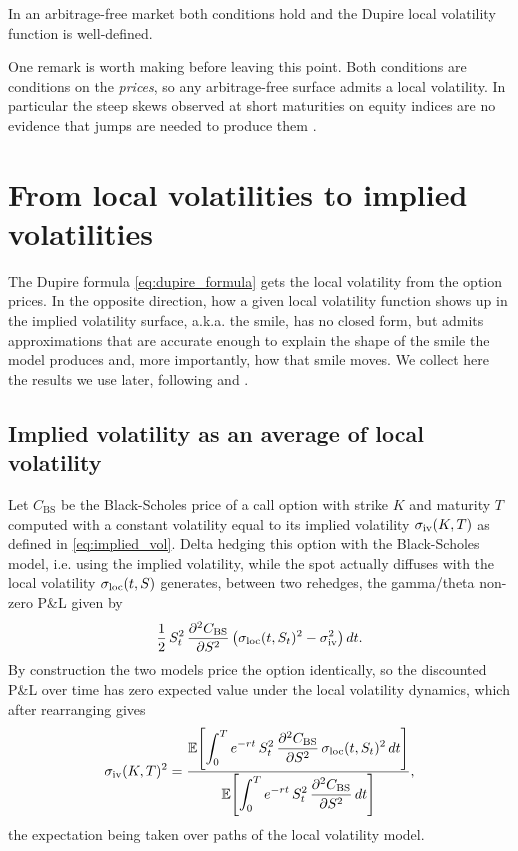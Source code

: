 In an arbitrage-free market both conditions hold and
the Dupire local volatility function is well-defined.

One remark is worth making before leaving this point.
Both conditions are conditions on the \textit{prices},
so any arbitrage-free surface admits a local volatility.
In particular the steep skews observed at short maturities on equity indices
are no evidence that jumps are needed to produce them \cite[Ch. 2]{bergomi_stochastic_vol}.

\section{From local volatilities to implied volatilities}\label{sec:lv_to_iv}

The Dupire formula \eqref{eq:dupire_formula} gets the local volatility from the option prices.
In the opposite direction,
how a given local volatility function shows up in the implied volatility surface, a.k.a. the smile,
has no closed form,
but admits approximations that are accurate enough to explain the shape of the smile the model produces and,
more importantly, how that smile moves.
We collect here the results we use later,
following \cite[Ch. 2]{bergomi_stochastic_vol} and \cite{derman_vol_smile}.

\subsection{Implied volatility as an average of local volatility}

Let $C_{\mathrm{BS}}$ be the Black-Scholes price of a call option with strike $K$ and maturity $T$
computed with a constant volatility equal to its implied volatility $\sigma_{\mathrm{iv}}(K,T)$
as defined in \eqref{eq:implied_vol}.
Delta hedging this option with the Black-Scholes model, i.e. using the implied volatility,
while the spot actually diffuses with the local volatility $\sigma_{\mathrm{loc}}(t,S)$ generates,
between two rehedges, the gamma/theta non-zero P\&L given by
\begin{equation*}
    \frac{1}{2}\,S_t^2\,\frac{\partial^2 C_{\mathrm{BS}}}{\partial S^2}
    \left(\sigma_{\mathrm{loc}}(t, S_t)^2 - \sigma_{\mathrm{iv}}^2\right) dt .
\end{equation*}
By construction the two models price the option identically,
so the discounted P\&L over time has zero expected value under the local volatility dynamics,
which after rearranging gives \cite[Ch. 2]{bergomi_stochastic_vol}
\begin{equation}\label{eq:iv_gamma_average}
    \sigma_{\mathrm{iv}}(K,T)^2
    = \frac{
        \mathbb{E}\!\left[\displaystyle\int_0^T e^{-rt}\,S_t^2\,
            \frac{\partial^2 C_{\mathrm{BS}}}{\partial S^2}\,\sigma_{\mathrm{loc}}(t, S_t)^2\,dt\right]
      }{
        \mathbb{E}\!\left[\displaystyle\int_0^T e^{-rt}\,S_t^2\,
            \frac{\partial^2 C_{\mathrm{BS}}}{\partial S^2}\,dt\right]
      },
\end{equation}
the expectation being taken over paths of the local volatility model.

